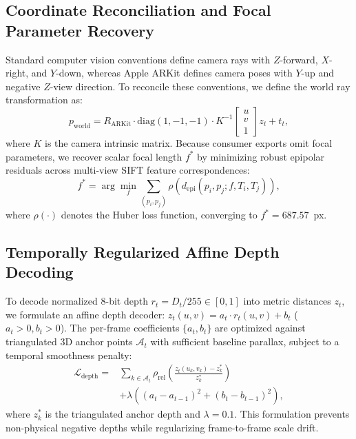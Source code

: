 \documentclass[conference]{IEEEtran}
\begin{document}
\subsection{Coordinate Reconciliation and Focal Parameter Recovery}
Standard computer vision conventions define camera rays with $Z$-forward, $X$-right, and $Y$-down, whereas Apple ARKit defines camera poses with $Y$-up and negative $Z$-view direction. To reconcile these conventions, we define the world ray transformation as:
\begin{equation}
p_{\mathrm{world}} = R_{\mathrm{ARKit}} \cdot \mathrm{diag}(1, -1, -1) \cdot K^{-1} \begin{bmatrix} u \\ v \\ 1 \end{bmatrix} z_t + t_t,
\end{equation}
where $K$ is the camera intrinsic matrix. Because consumer exports omit focal parameters, we recover scalar focal length $f^*$ by minimizing robust epipolar residuals across multi-view SIFT feature correspondences:
\begin{equation}
f^* = \arg\min_f \sum_{(p_i, p_j)} \rho\left( d_{\mathrm{epi}}(p_i, p_j; f, T_i, T_j) \right),
\end{equation}
where $\rho(\cdot)$ denotes the Huber loss function, converging to $f^* = 687.57$~px.

\subsection{Temporally Regularized Affine Depth Decoding}
To decode normalized 8-bit depth $r_t = D_t / 255 \in [0, 1]$ into metric distances $z_t$, we formulate an affine depth decoder: $z_t(u, v) = a_t \cdot r_t(u, v) + b_t$ ($a_t > 0, b_t > 0$). The per-frame coefficients $\{a_t, b_t\}$ are optimized against triangulated 3D anchor points $\mathcal{A}_t$ with sufficient baseline parallax, subject to a temporal smoothness penalty:
\begin{equation}
\begin{aligned}
\mathcal{L}_{\mathrm{depth}} = & \sum_{k \in \mathcal{A}_t} \rho_{\mathrm{rel}}\left( \frac{z_t(u_k, v_k) - z_k^*}{z_k^*} \right) \\
& + \lambda \left( (a_t - a_{t-1})^2 + (b_t - b_{t-1})^2 \right),
\end{aligned}
\end{equation}
where $z_k^*$ is the triangulated anchor depth and $\lambda = 0.1$. This formulation prevents non-physical negative depths while regularizing frame-to-frame scale drift.
\end{document}
